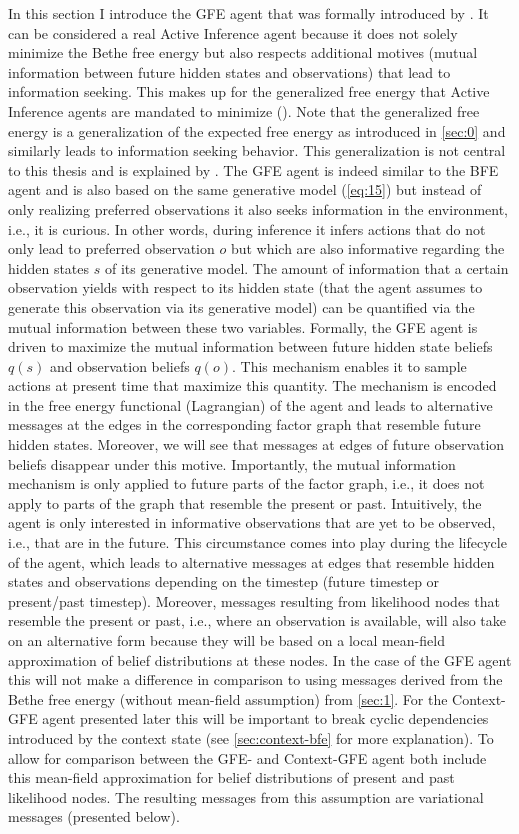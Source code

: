 In this section I introduce the GFE agent that was formally introduced by \textcite{delaar2023}. It can be considered a real Active Inference agent because it does not solely minimize the Bethe free energy but also respects additional motives (mutual information between future hidden states and observations) that lead to information seeking. This makes up for the generalized free energy that Active Inference agents are mandated to minimize (\cite{parr2019}). Note that the generalized free energy is a generalization of the expected free energy as introduced in \cref{sec:0} and similarly leads to information seeking behavior. This generalization is not central to this thesis and is explained by \textcite{parr2019}. The GFE agent is indeed similar to the BFE agent and is also based on the same generative model (\cref{eq:15}) but instead of only realizing preferred observations it also seeks information in the environment, i.e., it is curious. In other words, during inference it infers actions that do not only lead to preferred observation \(o\) but which are also informative regarding the hidden states \(s\) of its generative model. The amount of information that a certain observation yields with respect to its hidden state (that the agent assumes to generate this observation via its generative model) can be quantified via the mutual information between these two variables. Formally, the GFE agent is driven to maximize the mutual information between future hidden state beliefs \(q(s)\) and observation beliefs \(q(o)\). This mechanism enables it to sample actions at present time that maximize this quantity. The mechanism is encoded in the free energy functional (Lagrangian) of the agent and leads to alternative messages at the edges in the corresponding factor graph that resemble future hidden states. Moreover, we will see that messages at edges of future observation beliefs disappear under this motive. Importantly, the mutual information mechanism is only applied to future parts of the factor graph, i.e., it does not apply to parts of the graph that resemble the present or past. Intuitively, the agent is only interested in informative observations that are yet to be observed, i.e., that are in the future. This circumstance comes into play during the lifecycle of the agent, which leads to alternative messages at edges that resemble hidden states and observations depending on the timestep (future timestep or present/past timestep). Moreover, messages resulting from likelihood nodes that resemble the present or past, i.e., where an observation is available, will also take on an alternative form because they will be based on a local mean-field approximation of belief distributions at these nodes. In the case of the GFE agent this will not make a difference in comparison to using messages derived from the Bethe free energy (without mean-field assumption) from \cref{sec:1}. For the Context-GFE agent presented later this will be important to break cyclic dependencies introduced by the context state (see \cref{sec:context-bfe} for more explanation). To allow for comparison between the GFE- and Context-GFE agent both include this mean-field approximation for belief distributions of present and past likelihood nodes. The resulting messages from this assumption are variational messages (presented below).


